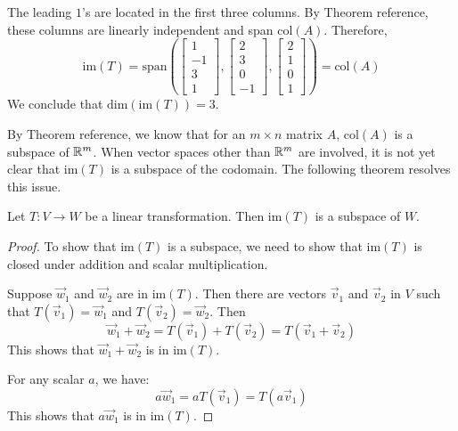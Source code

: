\documentclass{ximera}
\begin{document}
\begin{example}
\begin{explanation}
The leading $1$'s are located in the first three columns.  By Theorem {\color{red} reference}, these columns are linearly independent and span $\mbox{col}(A)$.  Therefore,
$$\mbox{im}(T)=\mbox{span}\left(\begin{bmatrix}1\\-1\\3\\1\end{bmatrix}, \begin{bmatrix}2\\3\\0\\-1\end{bmatrix}, \begin{bmatrix}2\\1\\0\\1\end{bmatrix}\right)=\mbox{col}(A)$$
We conclude that $\mbox{dim}(\mbox{im}(T))=3$.

\end{explanation}
\end{example}

By Theorem {\color{red}reference}, we know that for an $m\times n$ matrix $A$, $\mbox{col}(A)$ is a subspace of $\mathbb{R}^m$.  When vector spaces other than $\mathbb{R}^m$ are involved, it is not yet clear that $\mbox{im}(T)$ is a subspace of the codomain. The following theorem resolves this issue.

\begin{theorem}\label{th:imagesubspace}
Let $T:V\rightarrow W$ be a linear transformation.  Then $\mbox{im}(T)$ is a subspace of $W$.
\end{theorem}
\begin{proof}
To show that $\mbox{im}(T)$ is a subspace, we need to show that $\mbox{im}(T)$ is closed under addition and scalar multiplication.

Suppose $\vec{w}_1$ and $\vec{w}_2$ are in $\mbox{im}(T)$.  Then there are vectors $\vec{v}_1$ and $\vec{v}_2$ in $V$ such that $T(\vec{v}_1)=\vec{w}_1$ and $T(\vec{v}_2)=\vec{w}_2$.  Then
$$\vec{w}_1+\vec{w}_2=T(\vec{v}_1)+T(\vec{v}_2)=T(\vec{v}_1+\vec{v}_2)$$
This shows that $\vec{w}_1+\vec{w}_2$ is in $\mbox{im}(T)$.

For any scalar $a$, we have:
$$a\vec{w}_1=aT(\vec{v}_1)=T(a\vec{v}_1)$$
This shows that $a\vec{w}_1$ is in $\mbox{im}(T)$.
\end{proof}
\end{document}
